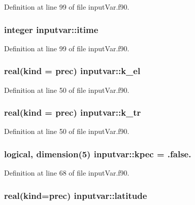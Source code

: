 Definition at line 99 of file input\-Var.\-f90.

\hypertarget{classinputvar_a06f760a3ae10a8b9834a7e0d270d1d59}{
\subsubsection[{itime}]{\setlength{\rightskip}{0pt plus 5cm}integer inputvar\-::itime}}\label{classinputvar_a06f760a3ae10a8b9834a7e0d270d1d59}


Definition at line 99 of file input\-Var.\-f90.

\hypertarget{classinputvar_a021273f9a287d8d4c9fcd0651bf17d8e}{
\subsubsection[{k\-\_\-el}]{\setlength{\rightskip}{0pt plus 5cm}real(kind = prec) inputvar\-::k\-\_\-el}}\label{classinputvar_a021273f9a287d8d4c9fcd0651bf17d8e}


Definition at line 50 of file input\-Var.\-f90.

\hypertarget{classinputvar_ad02af5c5e2d12134398545c12e832b9b}{
\subsubsection[{k\-\_\-tr}]{\setlength{\rightskip}{0pt plus 5cm}real(kind = prec) inputvar\-::k\-\_\-tr}}\label{classinputvar_ad02af5c5e2d12134398545c12e832b9b}


Definition at line 50 of file input\-Var.\-f90.

\hypertarget{classinputvar_a17bd2d4ef6c3b43e7b2d447f1fab021e}{
\subsubsection[{kpec}]{\setlength{\rightskip}{0pt plus 5cm}logical, dimension(5) inputvar\-::kpec = .false.}}\label{classinputvar_a17bd2d4ef6c3b43e7b2d447f1fab021e}


Definition at line 68 of file input\-Var.\-f90.

\hypertarget{classinputvar_aa7a4772c1f679371a4578409bd0e48c5}{
\subsubsection[{latitude}]{\setlength{\rightskip}{0pt plus 5cm}real(kind=prec) inputvar\-::latitude}}\label{classinputvar_aa7a4772c1f679371a4578409bd0e48c5}


